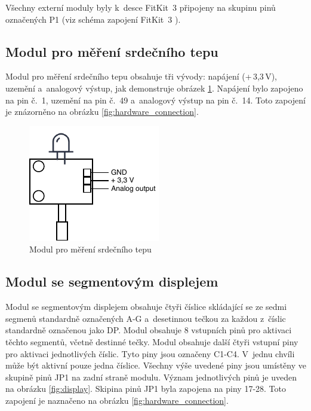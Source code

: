 \documentclass[a4paper, 11pt, twocolumn]{article}
\begin{document}
	Všechny externí moduly byly k~desce FitKit~3 připojeny na skupinu
	pinů označených P1 (viz schéma zapojení FitKit~3 \cite{fitkit_schema}).


	\subsection {Modul pro měření srdečního tepu}

	Modul pro měření srdečního tepu obsahuje tři vývody: napájení (+\,3,3\,V),
	uzemění a~analogový výstup, jak demonstruje obrázek \ref{fig:sensor}.
	Napájení bylo zapojeno na pin č.~1, uzemění na pin č.~49 a~analogový
	výstup na pin č.~14. Toto zapojení je znázorněno na obrázku
	\ref{fig:hardware_connection}.

	\begin{figure}[ht]
		\centering
		\includegraphics[width=0.8 \linewidth]{inc/sensor.pdf}

		\caption{Modul pro měření srdečního tepu}
		\label{fig:sensor}
	\end{figure}


	\subsection{Modul se segmentovým displejem}

	Modul se segmentovým displejem obsahuje čtyři číslice skládající se ze
	sedmi segmenů standardně označených A-G a~desetinnou tečkou za každou
	z~číslic standardně označenou jako DP. Modul obsahuje 8 vstupních pinů
	pro aktivaci těchto segmentů, včetně destinné tečky. Modul obsahuje další
	čtyři vstupní piny pro aktivaci jednotlivých číslic. Tyto piny jsou
	označeny C1-C4. V~jednu chvíli může být aktivní pouze jedna číslice.
	Všechny výše uvedené piny jsou umístěny ve skupině pinů JP1 na zadní
	straně modulu. Význam jednotlivých pinů je uveden na obrázku
	\ref{fig:display}. Skipina pinů JP1 byla zapojena na piny 17-28.
	Toto zapojení je naznačeno na obrázku \ref{fig:hardware_connection}.
\end{document}
